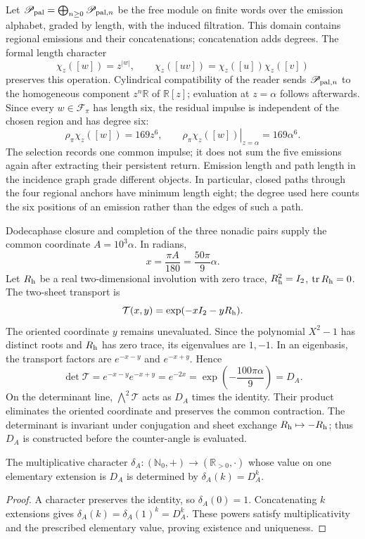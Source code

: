 Let \(\mathscr P_{\rm pal}=\bigoplus_{n\ge0}\mathscr P_{{\rm pal},n}\) be the free
module on finite words over the emission alphabet, graded by length,
with the induced filtration. This domain contains regional emissions
and their concatenations; concatenation adds degrees. The formal length character
\[
 \chi_z([w])=z^{|w|},\qquad
 \chi_z([uv])=\chi_z([u])\chi_z([v])
\]
preserves this operation. Cylindrical compatibility of the reader sends
\(\mathscr P_{{\rm pal},n}\) to the homogeneous component \(z^n\mathbb R\) of
\(\mathbb R[z]\); evaluation at \(z=\alpha\) follows afterwards.
Since every \(w\in\mathcal F_\pi\) has length six, the residual
impulse is independent of the chosen region and has degree six:
\[
 \rho_\pi\chi_z([w])=169z^6,
 \qquad\left.\rho_\pi\chi_z([w])\right|_{z=\alpha}=169\alpha^6.
\]
The selection records one common impulse; it does not sum the five
emissions again after extracting their persistent return.
Emission length and path length in the incidence graph grade different
objects. In particular, closed paths through the four regional anchors
have minimum length eight; the degree used here counts the six positions
of an emission rather than the edges of such a path.

Dodecaphase closure and completion of the three nonadic pairs supply
the common coordinate \(A=10^3\alpha\). In radians,
\[
 x=\frac{\pi A}{180}=\frac{50\pi}{9}\alpha.
\]
Let \(R_{\rm h}\) be a real two-dimensional involution with zero trace,
\(R_{\rm h}^2=I_2\), \(\operatorname{tr}R_{\rm h}=0\). The two-sheet transport is
\[
 \mathcal T(x,y)=\exp(-xI_2-yR_{\rm h}).
\]
The oriented coordinate \(y\) remains unevaluated. Since the polynomial
\(X^2-1\) has distinct roots and \(R_{\rm h}\) has zero trace, its eigenvalues
are \(1,-1\). In an eigenbasis, the transport factors are
\(e^{-x-y}\) and \(e^{-x+y}\). Hence
\[
 \det\mathcal T=e^{-x-y}e^{-x+y}=e^{-2x}
 =\exp\!\left(-\frac{100\pi\alpha}{9}\right)=D_A.
\]
On the determinant line, \(\bigwedge^2\mathcal T\) acts as
\(D_A\) times the identity. Their product eliminates the oriented coordinate and preserves the
common contraction. The determinant is invariant under conjugation and
sheet exchange \(R_{\rm h}\mapsto-R_{\rm h}\); thus \(D_A\) is constructed before
the counter-angle is evaluated.

\begin{proposition}
\label{prop:accion-caracter-determinantal}
The multiplicative character \(\delta_A:(\mathbb N_0,+)\to(\mathbb R_{>0},\cdot)\)
whose value on one elementary extension is \(D_A\) is determined
by \(\delta_A(k)=D_A^k\).
\end{proposition}
\begin{proof}
A character preserves the identity, so \(\delta_A(0)=1\).
Concatenating \(k\) extensions gives
\(\delta_A(k)=\delta_A(1)^k=D_A^k\). These powers satisfy
multiplicativity and the prescribed elementary value, proving
existence and uniqueness.
\end{proof}

